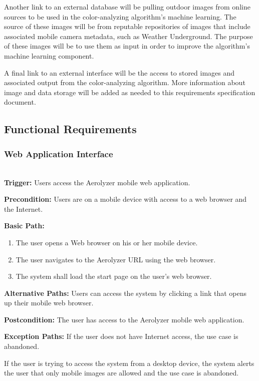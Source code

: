 \documentclass[letterpaper,10pt,draftclsnofoot,onecolumn]{IEEEtran}
\begin{document}
\begin{flushleft}
Another link to an external database will be pulling outdoor images from online sources to be used in the color-analyzing algorithm’s machine learning. 
The source of these images will be from reputable repositories of images that include associated mobile camera metadata, such as Weather Underground. 
The purpose of these images will be to use them as input in order to improve the algorithm’s machine learning component.

A final link to an external interface will be the access to stored images and associated output from the color-analyzing algorithm. 
More information about image and data storage will be added as needed to this requirements specification document.

\subsection{Functional Requirements}

\subsubsection{Web Application Interface} \ \\

\textbf{Trigger: } 
Users access the Aerolyzer mobile web application.

\textbf{Precondition: }
Users are on a mobile device with access to a web browser and the Internet.

\textbf{Basic Path: }
\begin{enumerate}
	\item The user opens a Web browser on his or her mobile device.
	\item The user navigates to the Aerolyzer URL using the web browser.
	\item The system shall load the start page on the user’s web browser.
\end{enumerate}

\textbf{Alternative Paths: }
Users can access the system by clicking a link that opens up their mobile web browser.

\textbf{Postcondition: }
The user has access to the Aerolyzer mobile web application.

\textbf{Exception Paths: }
If the user does not have Internet access, the use case is abandoned. 

If the user is trying to access the system from a desktop device, the system alerts the user that only mobile images are allowed and the use case is abandoned.\\ 


\end{flushleft}
\end{document}
